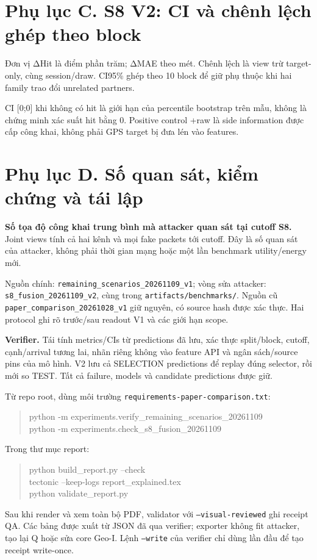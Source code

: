 \documentclass[10pt,a4paper]{article}
\begin{document}
\clearpage
\section*{Phụ lục C. S8 V2: CI và chênh lệch ghép theo block}
Đơn vị ΔHit là điểm phần trăm; ΔMAE theo mét. Chênh lệch là view trừ target-only, cùng session/draw.
CI95\% ghép theo 10 block để giữ phụ thuộc khi hai family trao đổi unrelated partners.
\begin{footnotesize}\end{footnotesize}
CI [0;0] khi không có hit là giới hạn của percentile bootstrap trên mẫu, không là chứng minh xác suất hit bằng 0.
Positive control +raw là side information được cấp công khai, không phải GPS target bị đưa lén vào features.

\clearpage
\section*{Phụ lục D. Số quan sát, kiểm chứng và tái lập}
\textbf{Số tọa độ công khai trung bình mà attacker quan sát tại cutoff S8.}
Joint views tính cả hai kênh và mọi fake packets tới cutoff. Đây là số quan sát của attacker,
không phải thời gian mạng hoặc một lần benchmark utility/energy mới.
\begin{small}\end{small}

Nguồn chính: \texttt{remaining\_scenarios\_20261109\_v1}; vòng sửa attacker:
\texttt{s8\_fusion\_20261109\_v2}, cùng trong \texttt{artifacts/benchmarks/}.
Nguồn cũ \texttt{paper\_comparison\_20261028\_v1} giữ nguyên, có source hash được xác thực.
Hai protocol ghi rõ trước/sau readout V1 và các giới hạn scope.

\textbf{Verifier.} Tái tính metrics/CIs từ predictions đã lưu, xác thực split/block, cutoff, cạnh/arrival tương lai,
nhãn riêng không vào feature API và ngân sách/source pins của mô hình. V2 lưu cả SELECTION predictions
để replay đúng selector, rồi mới so TEST. Tất cả failure, models và candidate predictions được giữ.

Từ repo root, dùng môi trường \texttt{requirements-paper-comparison.txt}:
\begin{quote}\small\ttfamily
python -m experiments.verify\_remaining\_scenarios\_20261109\\
python -m experiments.check\_s8\_fusion\_20261109
\end{quote}
Trong thư mục report:
\begin{quote}\small\ttfamily
python build\_report.py --check\\
tectonic --keep-logs report\_explained.tex\\
python validate\_report.py
\end{quote}
Sau khi render và xem toàn bộ PDF, validator với \texttt{--visual-reviewed} ghi receipt QA.
Các bảng được xuất từ JSON đã qua verifier; exporter không fit attacker, tạo lại Q hoặc sửa core Geo-I.
Lệnh \texttt{--write} của verifier chỉ dùng lần đầu để tạo receipt write-once.
\end{document}
